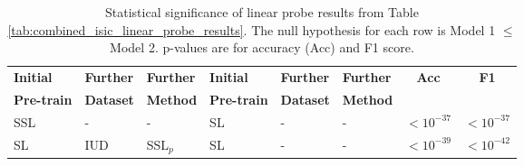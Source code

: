 \documentclass[a4paper,fleqn]{cas-dc}
\begin{document}
\begin{table}[httb]
\begin{tabular}{llllllcc}
\textbf{Initial} & \textbf{Further} & \textbf{Further} & \textbf{Initial} & \textbf{Further} & \textbf{Further} & \textbf{Acc} & \textbf{F1} \\
\textbf{Pre-train} & \textbf{Dataset} & \textbf{Method} & \textbf{Pre-train} & \textbf{Dataset} & \textbf{Method} & & \\
\midrule
SSL & - & - & SL & - & - & $<10^{-37}$ & $<10^{-37}$ \\
SL & IUD & SSL$_p$ & SL & - & - & $<10^{-39}$ & $<10^{-42}$ \\
\bottomrule
\end{tabular}
\caption{Statistical significance of linear probe results from Table \ref{tab:combined_isic_linear_probe_results}. The null hypothesis for each row is Model 1 $\leq$ Model 2. p-values are for accuracy (Acc) and F1 score.}
\label{tab:isic_linear_probe_sig}
\end{table}

\vskip3pt 
\end{document}
